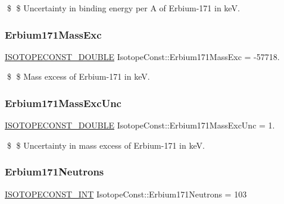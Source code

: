 \$ \$ Uncertainty in binding energy per A of Erbium-\/171 in keV. \mbox{\label{group___isotope_const-_erbium-_er171_ga15c1ae3d94e620dbba1d8ddfc9530046}} 
\subsubsection{\texorpdfstring{Erbium171\+Mass\+Exc}{Erbium171MassExc}}
{\footnotesize\ttfamily \mbox{\hyperlink{group___isotope_const-_macros_ga8f45a7272ce02c0b4c65c44636ed719a}{I\+S\+O\+T\+O\+P\+E\+C\+O\+N\+S\+T\+\_\+\+D\+O\+U\+B\+LE}} Isotope\+Const\+::\+Erbium171\+Mass\+Exc = -\/57718.}

\$ \$ Mass excess of Erbium-\/171 in keV. \mbox{\label{group___isotope_const-_erbium-_er171_ga2f527171183fbc996ac481a6bee5c88f}} 
\subsubsection{\texorpdfstring{Erbium171\+Mass\+Exc\+Unc}{Erbium171MassExcUnc}}
{\footnotesize\ttfamily \mbox{\hyperlink{group___isotope_const-_macros_ga8f45a7272ce02c0b4c65c44636ed719a}{I\+S\+O\+T\+O\+P\+E\+C\+O\+N\+S\+T\+\_\+\+D\+O\+U\+B\+LE}} Isotope\+Const\+::\+Erbium171\+Mass\+Exc\+Unc = 1.}

\$ \$ Uncertainty in mass excess of Erbium-\/171 in keV. \mbox{\label{group___isotope_const-_erbium-_er171_gab6f7e2bc2565c40798d2b0d00c39ed62}} 
\subsubsection{\texorpdfstring{Erbium171\+Neutrons}{Erbium171Neutrons}}
{\footnotesize\ttfamily \mbox{\hyperlink{group___isotope_const-_macros_ga5f18360b3e99483a35c32d789e62621c}{I\+S\+O\+T\+O\+P\+E\+C\+O\+N\+S\+T\+\_\+\+I\+NT}} Isotope\+Const\+::\+Erbium171\+Neutrons = 103}

